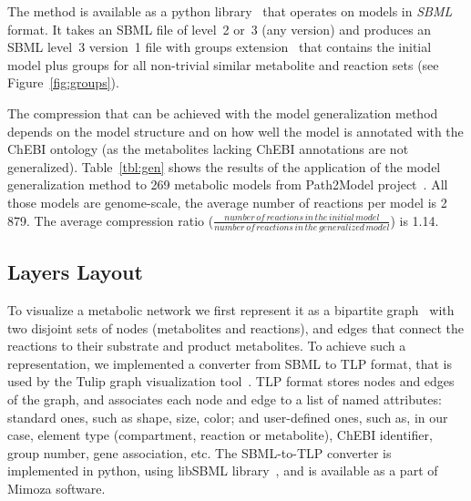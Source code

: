 \documentclass{bmcart}
\begin{document}
The method is available as a python library~\cite{Metamogen} that operates on models in \textit{SBML}~\cite{Hucka08} format. It takes an SBML file of level~2 or~3 (any version) and produces an SBML level~3 version~1 file with groups extension~\cite{Hucka2012} that contains the initial model plus groups for all non-trivial similar metabolite and reaction sets (see Figure~\ref{fig:groups}).

The compression that can be achieved with the model generalization method depends on the model structure and on how well the model is annotated with the ChEBI ontology (as the metabolites lacking ChEBI annotations are not generalized). Table~\ref{tbl:gen} shows the results of the application of the model generalization method to 269 metabolic models from Path2Model project~\cite{Buchel2013}. All those models are genome-scale, the average number of reactions per model is 2\,879. The average compression ratio ($\frac{number\,of\,reactions\,in\,the\,initial\,model}{number\,of\,reactions\,in\,the\,generalized\,model}$) is 1.14.


\subsection*{Layers Layout}
To visualize a metabolic network we first represent it as a bipartite graph~\cite{Diestel2012} with two disjoint sets of nodes (metabolites and reactions), and edges that connect the reactions to their substrate and product metabolites. To achieve such a representation, we implemented a converter from SBML to TLP format, that is used by the Tulip graph visualization tool~\cite{Auber04}. TLP format stores nodes and edges of the graph, and associates each node and edge to a list of named attributes: standard ones, such as shape, size, color; and user-defined ones, such as, in our case, element type (compartment, reaction or metabolite), ChEBI identifier, group number, gene association, etc. The SBML-to-TLP converter is implemented in python, using libSBML library~\cite{Bornstein2008}, and is available as a part of Mimoza software. 
\end{document}

